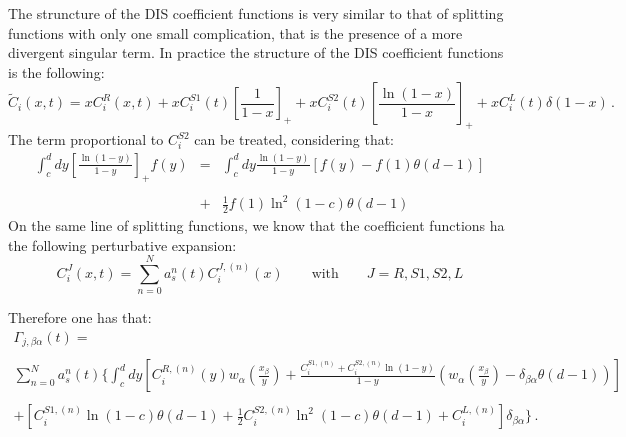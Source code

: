 \documentclass[10pt,a4paper]{article}
\begin{document}
The struncture of the DIS coefficient functions is very similar to
that of splitting functions with only one small complication, that is
the presence of a more divergent singular term. In practice the
structure of the DIS coefficient functions is the following:
\begin{equation}
\widetilde{C}_{i}(x,t) = xC_{i}^{R}(x,t) +
xC_{i}^{S1}(t)\left[\frac{1}{1-x}\right]_+ +
xC_{i}^{S2}(t)\left[\frac{\ln(1-x)}{1-x}\right]_+ + xC_{i}^{L}(t)\delta(1-x)\,.
\end{equation}
The term proportional to $C_{i}^{S2}$ can be treated, considering that:
\begin{equation}
\begin{array}{rcl}
\displaystyle \int_c^ddy\left[\frac{\ln(1-y)}{1-y}\right]_+f(y)
&=&\displaystyle \int_c^ddy\frac{\ln(1-y)}{1-y}\left[f(y)-f(1)\theta(d-1)\right]\\
\\
&+&\displaystyle \frac12 f(1) \ln^2(1-c)\theta(d-1)
\end{array}
\end{equation}
On the same line of splitting functions, we know that the coefficient
functions ha the following perturbative expansion:
\begin{equation}
C_{i}^{J}(x,t) = \sum_{n=0}^{N}a_s^{n}(t)C_{i}^{J,(n)}(x)\qquad\mbox{with}\qquad J=R,S1,S2,L
\end{equation}

Therefore one has that:
\begin{equation}
\begin{array}{c}
\displaystyle \Gamma_{j,\beta\alpha}(t) = \\
\\
\displaystyle \sum_{n=0}^{N} a_s^{n}(t) \bigg\{\int^{d}_{c}dy\left[{C}_{i}^{R,(n)}(y)w_{\alpha}\left(\frac{x_\beta}{y}\right)+\frac{{C}_{i}^{S1,(n)}+{C}_{i}^{S2,(n)}\ln(1-y)}{1-y}\left(w_{\alpha}\left(\frac{x_\beta}{y}\right)-\delta_{\beta\alpha}\theta(d-1)\right)\right]\\
\\
\displaystyle +\left[{C}_{i}^{S1,(n)}\ln(1-c)\theta(d-1)+\frac12{C}_{i}^{S2,(n)}\ln^2(1-c)\theta(d-1)+{C}_{i}^{L,(n)}\right]\delta_{\beta\alpha}\bigg\}\,.
\end{array}
\end{equation}
\end{document}
